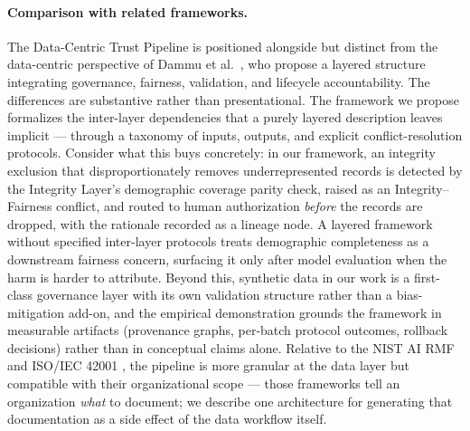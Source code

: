 \documentclass[11pt]{article}
\begin{document}
\paragraph{Comparison with related frameworks.} The Data-Centric Trust Pipeline is positioned alongside but distinct from the data-centric perspective of Dammu et al.\ \cite{Dammu2026}, who propose a layered structure integrating governance, fairness, validation, and lifecycle accountability. The differences are substantive rather than presentational. The framework we propose formalizes the inter-layer dependencies that a purely layered description leaves implicit --- through a taxonomy of inputs, outputs, and explicit conflict-resolution protocols. Consider what this buys concretely: in our framework, an integrity exclusion that disproportionately removes underrepresented records is detected by the Integrity Layer's demographic coverage parity check, raised as an Integrity--Fairness conflict, and routed to human authorization \emph{before} the records are dropped, with the rationale recorded as a lineage node. A layered framework without specified inter-layer protocols treats demographic completeness as a downstream fairness concern, surfacing it only after model evaluation when the harm is harder to attribute. Beyond this, synthetic data in our work is a first-class governance layer with its own validation structure rather than a bias-mitigation add-on, and the empirical demonstration grounds the framework in measurable artifacts (provenance graphs, per-batch protocol outcomes, rollback decisions) rather than in conceptual claims alone. Relative to the NIST AI RMF \cite{NIST_AIRM_2023} and ISO/IEC 42001 \cite{ISO_42001_2023}, the pipeline is more granular at the data layer but compatible with their organizational scope --- those frameworks tell an organization \emph{what} to document; we describe one architecture for generating that documentation as a side effect of the data workflow itself.
\end{document}
